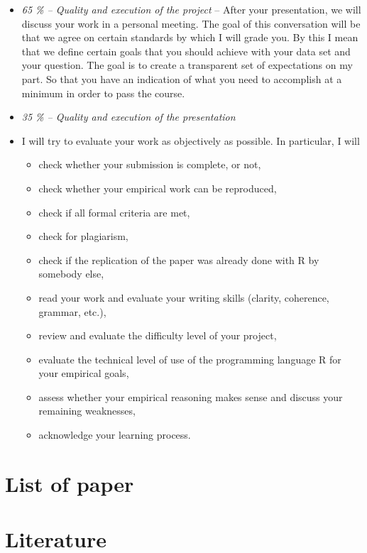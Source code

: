 \documentclass[
  a4paper,
  onecolumn,
  oneside]{scrartcl}
\providecommand{\tightlist}{%
  \setlength{\itemsep}{0pt}\setlength{\parskip}{0pt}}\usepackage{longtable,booktabs,array}
\begin{document}
\begin{itemize}
\item
  \emph{65 \% -- Quality and execution of the project} -- After your
  presentation, we will discuss your work in a personal meeting. The
  goal of this conversation will be that we agree on certain standards
  by which I will grade you. By this I mean that we define certain goals
  that you should achieve with your data set and your question. The goal
  is to create a transparent set of expectations on my part. So that you
  have an indication of what you need to accomplish at a minimum in
  order to pass the course.
\item
  \emph{35 \% -- Quality and execution of the presentation}
\item
  I will try to evaluate your work as objectively as possible. In
  particular, I will

  \begin{itemize}
  \tightlist
  \item
    check whether your submission is complete, or not,
  \item
    check whether your empirical work can be reproduced,
  \item
    check if all formal criteria are met,
  \item
    check for plagiarism,
  \item
    check if the replication of the paper was already done with R by
    somebody else,
  \item
    read your work and evaluate your writing skills (clarity, coherence,
    grammar, etc.),
  \item
    review and evaluate the difficulty level of your project,
  \item
    evaluate the technical level of use of the programming language R
    for your empirical goals,
  \item
    assess whether your empirical reasoning makes sense and discuss your
    remaining weaknesses,
  \item
    acknowledge your learning process.
  \end{itemize}
\end{itemize}

\section{List of paper}\label{sec-projects}

\section{Literature}\label{literature}

\renewcommand{\bibsection}{}

\end{document}
